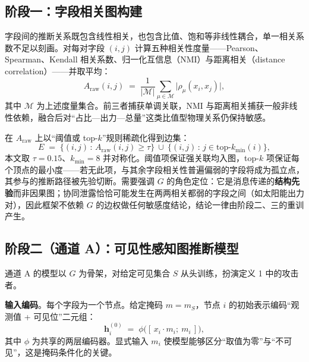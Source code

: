 \documentclass[10.5pt,compsoc,UTF8]{CjC}
\theoremstyle{mystyle}
\begin{document}
\subsection{阶段一：字段相关图构建}

字段间的推断关系既包含线性相关，也包含比值、饱和等非线性耦合，单一相关系数不足以刻画。对每对字段 $(i,j)$ 计算五种相关性度量——Pearson、Spearman、Kendall 相关系数、归一化互信息（NMI）与距离相关（distance correlation）——并取平均：
\begin{equation}
A_{\mathrm{raw}}(i,j)\;=\;\frac{1}{|\mathcal{M}|}\sum_{\mu\in\mathcal{M}}\bigl|\rho_{\mu}(x_i,x_j)\bigr|,
\label{eq:corr}
\end{equation}
其中 $\mathcal{M}$ 为上述度量集合。前三者捕获单调关联，NMI 与距离相关捕获一般非线性依赖，融合后对“占比—出力—总量”这类比值型物理关系仍保持敏感。

在 $A_{\mathrm{raw}}$ 上以“阈值或 top-$k$”规则稀疏化得到边集：
\begin{equation}
E\;=\;\bigl\{(i,j)\,:\,A_{\mathrm{raw}}(i,j)\ge\tau\bigr\}\ \cup\ \bigl\{(i,j)\,:\,j\in\mathrm{top}\text{-}k_{\min}(i)\bigr\},
\label{eq:edge}
\end{equation}
本文取 $\tau=0.15$、$k_{\min}=8$ 并对称化。阈值项保证强关联均入图，top-$k$ 项保证每个顶点的最小度——若无此项，与其余字段相关性普遍偏弱的字段将成为孤立点，其参与的推断路径被先验切断。需要强调 $G$ 的角色定位：它是消息传递的\textbf{结构先验}而非因果图；协同泄露恰恰可能发生在两两相关都弱的字段之间（如太阳能出力对），因此框架不依赖 $G$ 的边权做任何敏感度结论，结论一律由阶段二、三的重训产生。

\subsection{阶段二（通道 A）：可见性感知图推断模型}

通道 A 的模型以 $G$ 为骨架，对给定可见集合 $S$ 从头训练，扮演定义 1 中的攻击者。

\textbf{输入编码}。每个字段为一个节点。给定掩码 $m=m_S$，节点 $i$ 的初始表示编码“观测值 + 可见位”二元组：
\begin{equation}
\mathbf{h}_i^{(0)}\;=\;\phi\bigl([\,x_i\cdot m_i;\ m_i\,]\bigr),
\label{eq:enc}
\end{equation}
其中 $\phi$ 为共享的两层编码器。显式输入 $m_i$ 使模型能够区分“取值为零”与“不可见”，这是掩码条件化的关键。
\end{document}
